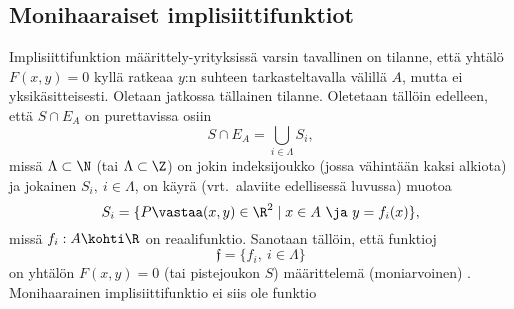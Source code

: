 \subsection{Monihaaraiset implisiittifunktiot}

Implisiittifunktion määrittely-yrityksissä varsin tavallinen on tilanne, että yhtälö $F(x,y)=0$
kyllä ratkeaa $y$:n suhteen tarkasteltavalla välillä $A$, mutta ei yksikäsitteisesti. Oletaan
jatkossa tällainen tilanne. Oletetaan tällöin edelleen, että $S\cap E_A$ on purettavissa osiin
\[
S\cap E_A = \bigcup_{i\in \Lambda} S_i,
\]
missä $\Lambda \subset \N$ (tai $\Lambda \subset \Z$) on jokin indeksijoukko (jossa vähintään
kaksi alkiota) ja jokainen $S_i,\ i \in \Lambda$, on käyrä (vrt.\ alaviite edellisessä luvussa)
muotoa
\[
S_i=\{P \vastaa (x,y) \in \R^2 \mid x \in A \ \ja \ y=f_i(x)\},
\]
missä $f_i: A \kohti \R$ on reaalifunktio. Sanotaan tällöin, että funktioj
\[
\mathfrak{f}=\{f_i, \ i \in \Lambda \}
\]
on yhtälön $F(x,y)=0$ (tai pistejoukon $S$) määrittelemä  (moniarvoinen)
. Monihaarainen implisiittifunktio ei siis ole funktio

\pagebreak 

